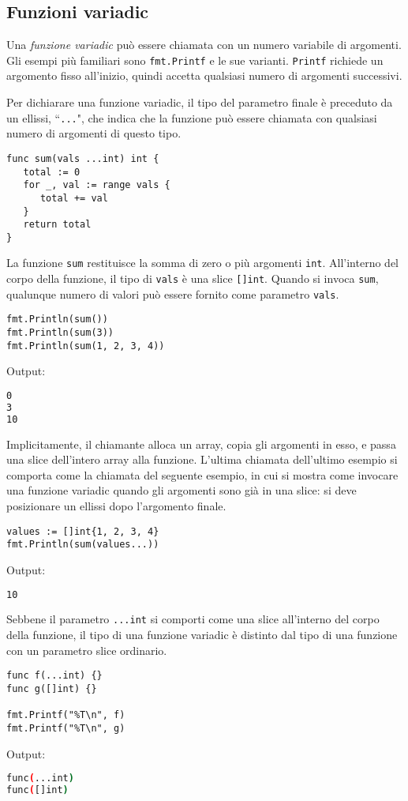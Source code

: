 \documentclass[../../thesis.tex]{subfiles}
\begin{document}
    \subsection{Funzioni variadic}\label{subsec:funzioni-variadic}
    Una \textit{funzione variadic} può essere chiamata con un numero variabile di argomenti.
    Gli esempi più familiari sono \verb"fmt.Printf" e le sue varianti. \verb"Printf" richiede un argomento fisso all'inizio, quindi accetta qualsiasi numero di argomenti successivi.
    \hfill \vspace{12pt}

    Per dichiarare una funzione variadic, il tipo del parametro finale è preceduto da un ellissi, ``\verb"..."", che indica che la funzione può essere chiamata con qualsiasi numero di argomenti di questo tipo.
    \begin{lstlisting}[frame = single, label = {lst:lstlisting4-7.1}]
func sum(vals ...int) int {
   total := 0
   for _, val := range vals {
      total += val
   }
   return total
}
    \end{lstlisting}
    La funzione \verb"sum" restituisce la somma di zero o più argomenti \verb"int".
    All'interno del corpo della funzione, il tipo di \verb"vals" è una slice \verb"[]int".
    Quando si invoca \verb"sum", qualunque numero di valori può essere fornito come parametro \verb"vals".
    \begin{lstlisting}[frame = single, label = {lst:lstlisting4-7.2}]
fmt.Println(sum())
fmt.Println(sum(3))
fmt.Println(sum(1, 2, 3, 4))
    \end{lstlisting}
    Output:
    \begin{lstlisting}[language = bash, frame = L, label = {lst:lstlisting4-7.3}]
0
3
10
    \end{lstlisting}
    Implicitamente, il chiamante alloca un array, copia gli argomenti in esso, e passa una slice dell'intero array alla funzione.
    L'ultima chiamata dell'ultimo esempio si comporta come la chiamata del seguente esempio, in cui si mostra come invocare una funzione variadic quando gli argomenti sono già in una slice: si deve posizionare un ellissi dopo l'argomento finale.
    \begin{lstlisting}[frame = single, label = {lst:lstlisting4-7.4}]
values := []int{1, 2, 3, 4}
fmt.Println(sum(values...))
    \end{lstlisting}
    Output:
    \begin{lstlisting}[language = bash, frame = L, label = {lst:lstlisting4-7.5}]
10
    \end{lstlisting}
    Sebbene il parametro \verb"...int" si comporti come una slice all'interno del corpo della funzione, il tipo di una funzione variadic è distinto dal tipo di una funzione con un parametro slice ordinario.
    \begin{lstlisting}[frame = single, label = {lst:lstlisting4-7.6}]
func f(...int) {}
func g([]int) {}

fmt.Printf("%T\n", f)
fmt.Printf("%T\n", g)
    \end{lstlisting}
    Output:
    \begin{lstlisting}[language = bash, frame = L, label = {lst:lstlisting4-7.7}]
func(...int)
func([]int)
    \end{lstlisting}
\end{document}

